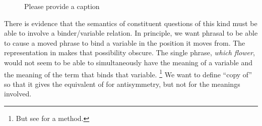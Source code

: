 \documentclass[output=paper]{langsci/langscibook}
\begin{document}
\begin{figure}
\caption{\color{red}Please provide a caption\label{ex:multi1}}
\end{figure}
%

There is evidence that the semantics of constituent questions of this kind must be able to involve a binder/variable relation. In principle, we want phrasal  to be able to cause a moved phrase to bind a variable in the position it moves from. The representation in  makes that possibility obscure. The single phrase, \emph{which flower}, would not seem to be able to simultaneously have the meaning of a variable and the meaning of the term that binds that variable.%
\footnote{But see \textcite{Engdahl1986} for a method.} %
We want to define ``copy of'' so that it gives the equivalent of  for antisymmetry, but not for the meanings involved.
\end{document}
